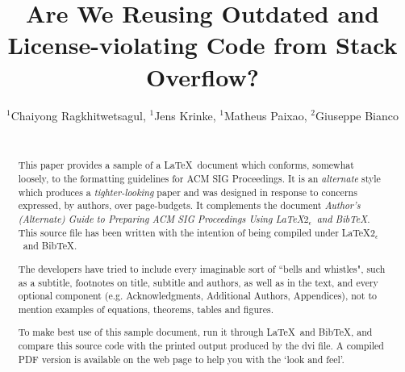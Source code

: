 \documentclass{sig-alternate-05-2015}
\begin{document}






%

\title{Are We Reusing Outdated and License-violating Code \newline from Stack Overflow?}

\author{
	\alignauthor
	$^1$Chaiyong Ragkhitwetsagul, $^1$Jens Krinke, $^1$Matheus Paixao, $^2$Giuseppe Bianco \\
	\\
}


\maketitle
\begin{abstract}
This paper provides a sample of a \LaTeX\ document which conforms,
somewhat loosely, to the formatting guidelines for
ACM SIG Proceedings. It is an {\em alternate} style which produces
a {\em tighter-looking} paper and was designed in response to
concerns expressed, by authors, over page-budgets.
It complements the document \textit{Author's (Alternate) Guide to
Preparing ACM SIG Proceedings Using \LaTeX$2_\epsilon$\ and Bib\TeX}.
This source file has been written with the intention of being
compiled under \LaTeX$2_\epsilon$\ and BibTeX.

The developers have tried to include every imaginable sort
of ``bells and whistles", such as a subtitle, footnotes on
title, subtitle and authors, as well as in the text, and
every optional component (e.g. Acknowledgments, Additional
Authors, Appendices), not to mention examples of
equations, theorems, tables and figures.

To make best use of this sample document, run it through \LaTeX\
and BibTeX, and compare this source code with the printed
output produced by the dvi file. A compiled PDF version
is available on the web page to help you with the
`look and feel'.
\end{abstract}
\end{document}
